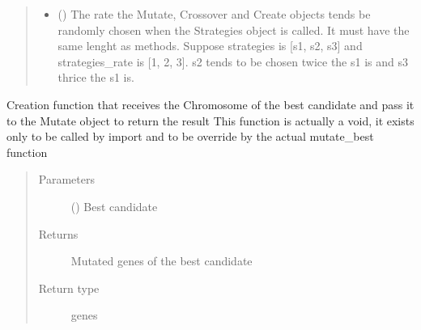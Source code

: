 \documentclass[letterpaper,10pt,english]{sphinxmanual}
\begin{document}
\begin{fulllineitems}
\begin{quote}
\begin{description}
\begin{itemize}
\item {} 
\sphinxAtStartPar
{} (\sphinxstyleliteralemphasis{\sphinxupquote{{[}}}\sphinxstyleliteralemphasis{\sphinxupquote{{]}}}) \textendash{} The rate the Mutate, Crossover and Create objects tends be randomly chosen when the
Strategies object is called. It must have the same lenght as methods. Suppose strategies is {[}s1, s2, s3{]} and
strategies\_rate is  {[}1, 2, 3{]}. s2 tends to be chosen twice the s1 is and s3 thrice the s1 is.

\end{itemize}

\end{description}\end{quote}

\end{fulllineitems}


\begin{fulllineitems}
\label{\detokenize{genetic:genetic.mutate_best}}
\sphinxAtStartPar
Creation function that receives the Chromosome of the best candidate and pass it to the Mutate object to return
the result
This function is actually a void, it exists only to be called by import and to be override by the actual mutate\_best
function
\begin{quote}\begin{description}
\item[{Parameters}] \leavevmode
\sphinxAtStartPar
{} ({\hyperref[\detokenize{genetic:genetic.Chromosome}]{}}) \textendash{} Best candidate

\item[{Returns}] \leavevmode
\sphinxAtStartPar
Mutated genes of the best candidate

\item[{Return type}] \leavevmode
\sphinxAtStartPar
genes

\end{description}\end{quote}

\end{fulllineitems}
\end{document}
